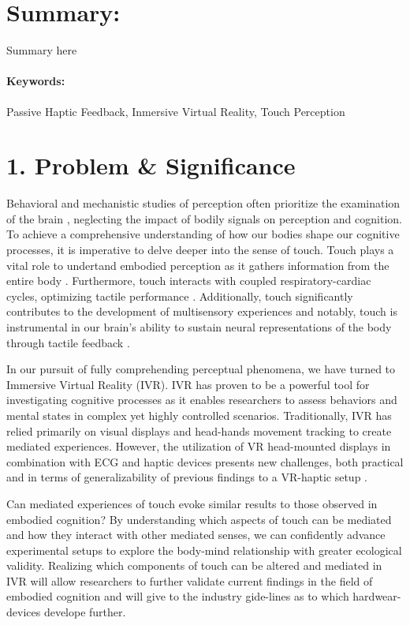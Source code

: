 \documentclass[12pt,oneside,openright]{report}
\newcommand{\skills}{Passive Haptic Feedback, Inmersive Virtual Reality, Touch Perception}
\begin{document}
\section*{Summary:}
Summary here

\vspace*{0,5cm}

\paragraph{\textbf{Keywords:}}\skills{}


\section*{1. Problem \& Significance}

Behavioral and mechanistic studies of perception often prioritize the examination of the brain \cite{Hofmann2021}, neglecting the impact of bodily signals on perception and cognition. To achieve a comprehensive understanding of how our bodies shape our cognitive processes, it is imperative to delve deeper into the sense of touch. Touch plays a vital role to undertand embodied perception as it gathers information from the entire body \cite*{Field2014}.  Furthermore, touch interacts with coupled respiratory-cardiac cycles, optimizing tactile performance \cite{Grund643}.  Additionally, touch significantly contributes to the development of multisensory experiences \cite{BREMNER2017227} and notably, touch is instrumental in our brain's ability to sustain neural representations of the body through tactile feedback \cite{Cole2016}.

In our pursuit of fully comprehending perceptual phenomena, we have turned to Immersive Virtual Reality (IVR). IVR has proven to be a powerful tool for investigating cognitive processes as it enables researchers to assess behaviors and mental states in complex yet highly controlled scenarios. Traditionally, IVR has relied primarily on visual displays and head-hands movement tracking to create mediated experiences. However, the utilization of VR head-mounted displays in combination with ECG and haptic devices presents new challenges, both practical and in terms of generalizability of previous findings to a VR-haptic setup \cite*{Klotzsche2023}.

Can mediated experiences of touch evoke similar results to those observed in embodied cognition? By understanding which aspects of touch can be mediated and how they interact with other mediated senses, we can confidently advance experimental setups to explore the body-mind relationship with greater ecological validity. Realizing which components of touch can be altered and mediated in IVR will allow researchers to further validate current findings in the field of embodied cognition and will give to the industry gide-lines as to which hardwear-devices develope further.  
\end{document}
